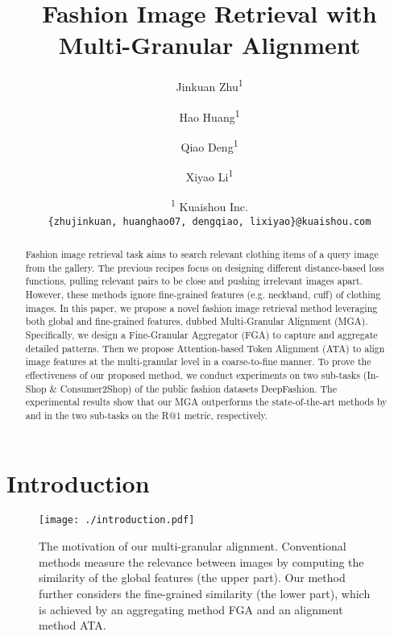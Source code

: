 \documentclass[10pt,twocolumn,letterpaper]{article}
\begin{document}
\title{Fashion Image Retrieval with Multi-Granular Alignment}

\author{
Jinkuan Zhu\textsuperscript{1}
\and
Hao Huang\textsuperscript{1}
\and
Qiao Deng\textsuperscript{1} 
\and 
Xiyao Li\textsuperscript{1} 
\and 
\textsuperscript{1} Kuaishou Inc. \\
{\tt\small 
\{zhujinkuan, huanghao07, dengqiao, lixiyao\}@kuaishou.com
}
}
\maketitle

\begin{abstract}
Fashion image retrieval task aims to search relevant clothing items of a query image from the gallery. The previous recipes focus on designing different distance-based loss functions, pulling relevant pairs to be close and pushing irrelevant images apart. However, these methods ignore fine-grained features (e.g. neckband, cuff) of clothing images. In this paper, we propose a novel fashion image retrieval method leveraging both global and fine-grained features, dubbed Multi-Granular Alignment (MGA). Specifically, we design a Fine-Granular Aggregator (FGA) to capture and aggregate detailed patterns. Then we propose Attention-based Token Alignment (ATA) to align image features at the multi-granular level in a coarse-to-fine manner. To prove the effectiveness of our proposed method, we conduct experiments on two sub-tasks (In-Shop \& Consumer2Shop) of the public fashion datasets DeepFashion. The experimental results show that our MGA outperforms the state-of-the-art methods by  and  in the two sub-tasks on the R@1 metric, respectively.
\end{abstract}



\section{Introduction}

\begin{figure}[t]
  \centering
  \texttt{[image: ./introduction.pdf]}
\caption{The motivation of our multi-granular alignment. Conventional methods measure the relevance between images by computing the similarity of the global features (the upper part). Our method further considers the fine-grained similarity (the lower part), which is achieved by an aggregating method FGA and an alignment method ATA.}
  \label{fig1}
\end{figure} 
\end{document}
